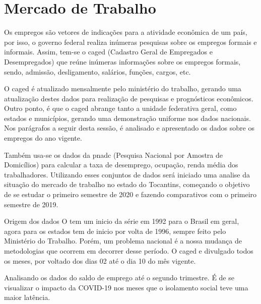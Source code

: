 \chapter{Mercado de Trabalho}

\par Os empregos são  vetores de indicações para a atividade econômica de um país, por isso, o governo federal realiza inúmeras pesquisas sobre os empregos formais e informais. Assim, tem-se o \acrshort{caged} (Cadastro Geral de Empregados e Desempregados) que reúne inúmeras informações sobre os empregos formais, sendo, admissão, desligamento, salários, funções, cargos, etc.
\par O \acrshort{caged} é atualizado mensalmente pelo ministério do trabalho, gerando uma atualização destes dados para realização de pesquisas e prognósticos econômicos. Outro ponto, é que o \acrshort{caged} abrange tanto a unidade federativa geral, como estados e municípios, gerando uma demonstração uniforme nos dados nacionais. Nos parágrafos a seguir desta sessão, é analisado e apresentado os dados sobre os empregos do ano vigente.
\par Também usa-se os dados da \acrshort{pnadc} (Pesquisa Nacional por Amostra de Domicílios) para calcular a taxa de desemprego, ocupação, renda média dos trabalhadores. Utilizando esses conjuntos de dados será iniciado uma analise da situação do mercado de trabalho no estado do Tocantins, começando  o objetivo de se estudar o primeiro semestre de 2020 e fazendo comparativos com o primeiro semestre de 2019.

\begin{smbox}[label={labelbox},nameref={Empregos}]{Origem dos dados}
	O  tem um inicio da série em 1992 para o Brasil em geral, agora para os estados tem de inicio por volta de 1996, sempre feito pelo Ministério do Trabalho. Porém, um problema nacional é a nossa mudança de metodologias que ocorrem em decorrer desse período. O \acrshort{caged} e divulgado todos os meses, por voltado dos dias 02 até o dia 10 do mês vigente.
\end{smbox}

\par Analisando os dados do saldo de emprego até o segundo trimestre. É de se visualizar o impacto da COVID-19 nos meses que o isolamento social teve uma maior latência.

